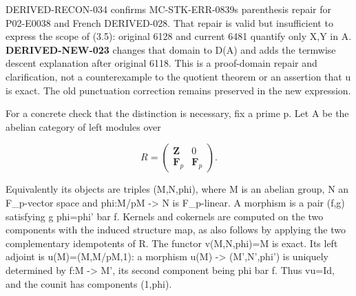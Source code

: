 \documentclass[11pt]{article}
\begin{document}
DERIVED-RECON-034 confirms MC-STK-ERR-0839\textquotesingle s parenthesis repair for P02-E0038 and French DERIVED-028. That repair is valid but insufficient to express the scope of (3.5)\allowbreak{}:\allowbreak{} original 6128 and current 6481 quantify only X,\allowbreak{}Y in A. \textbf{DERIVED-NEW-023} changes that domain to D(A)\allowbreak{} and adds the termwise descent explanation after original 6118. This is a proof-domain repair and clarification,\allowbreak{} not a counterexample to the quotient theorem or an assertion that u is exact. The old punctuation correction remains preserved in the new expression.

For a concrete check that the distinction is necessary,\allowbreak{} fix a prime p. Let A be the abelian category of left modules over

\[
 R=\begin{pmatrix}\mathbf Z&0\\\mathbf F_p&\mathbf F_p\end{pmatrix}.
\]

Equivalently its objects are triples (M,\allowbreak{}N,\allowbreak{}phi)\allowbreak{},\allowbreak{} where M is an abelian group,\allowbreak{} N an F\_\allowbreak{}p-vector space and phi:\allowbreak{}M/\allowbreak{}pM \allowbreak{}-> N is F\_\allowbreak{}p-linear. A morphism is a pair (f,\allowbreak{}g)\allowbreak{} satisfying g phi\allowbreak{}=phi' bar f. Kernels and cokernels are computed on the two components with the induced structure map,\allowbreak{} as also follows by applying the two complementary idempotents of R. The functor v(M,\allowbreak{}N,\allowbreak{}phi)\allowbreak{}\allowbreak{}=M is exact. Its left adjoint is u(M)\allowbreak{}\allowbreak{}=(M,\allowbreak{}M/\allowbreak{}pM,\allowbreak{}1)\allowbreak{}:\allowbreak{} a morphism u(M)\allowbreak{} \allowbreak{}-> (M',\allowbreak{}N',\allowbreak{}phi')\allowbreak{} is uniquely determined by f:\allowbreak{}M \allowbreak{}-> M',\allowbreak{} its second component being phi\textquotesingle{} bar f. Thus vu\allowbreak{}=Id,\allowbreak{} and the counit has components (1,\allowbreak{}phi)\allowbreak{}.
\end{document}
